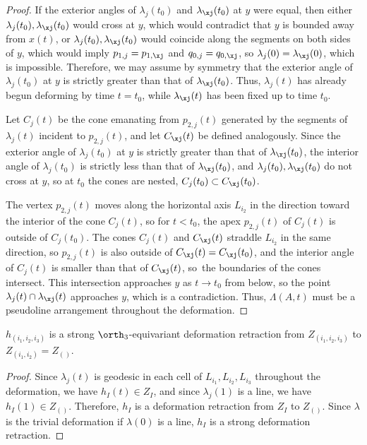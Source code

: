 \begin{proof}
If the exterior angles of $\lambda_j(t_0)$ and $\lambda_\xj(t_0)$ at $y$ were equal, then either $\lambda_j(t_0),\lambda_\xj(t_0)$ would cross at $y$, which would contradict that $y$ is bounded away from $x(t)$, or $\lambda_j(t_0),\lambda_\xj(t_0)$ would coincide along the segments on both sides of $y$, which would imply $p_{1,j} = p_{1,\xj}$ and $q_{0,j} = q_{0,\xj}$, so $\lambda_j(0) = \lambda_\xj(0)$, which is impossible.
Therefore, we may assume by symmetry that the exterior angle of $\lambda_j(t_0)$ at $y$ is strictly greater than that of $\lambda_\xj(t_0)$. Thus, $\lambda_j(t)$ has already begun deforming by time $t=t_0$, while $\lambda_\xj(t)$ has been fixed up to time $t_0$.

Let $C_j(t)$ be the cone emanating from $p_{2,j}(t)$ generated by the segments of $\lambda_j(t)$ incident to $p_{2,j}(t)$, and let $C_\xj(t)$ be defined analogously.
Since the exterior angle of $\lambda_j(t_0)$ at $y$ is strictly greater than that of $\lambda_\xj(t_0)$, the interior angle of $\lambda_j(t_0)$ is strictly less than that of $\lambda_\xj(t_0)$, and $\lambda_j(t_0),\lambda_\xj(t_0)$ do not cross at $y$, so at $t_0$ the cones are nested, \ie $C_j(t_0) \subset C_\xj(t_0)$.

The vertex $p_{2,j}(t)$ moves along the horizontal axis $L_{i_2}$ in the direction toward the interior of the cone $C_j(t)$, so for $t < t_0$, the apex $p_{2,j}(t)$ of $C_j(t)$ is outside of $C_j(t_0)$. The cones $C_j(t)$ and $C_\xj(t)$ straddle $L_{i_2}$ in the same direction, so $p_{2,j}(t)$ is also outside of $C_\xj(t)= C_\xj(t_0)$, and the interior angle of $C_j(t)$ is smaller than that of $C_\xj(t)$, so~the boundaries of the cones intersect.
This intersection approaches $y$ as $t\to t_0$ from below, so the point $\lambda_j(t)\cap \lambda_\xj(t)$ approaches $y$, which is a contradiction.
Thus, $\Lambda(A,t)$ must be a pseudoline arrangement throughout the deformation.
\end{proof}

\begin{claim}\label{claim-deform-h3}
$h_{(i_1,i_2,i_3)}$ is a strong $\orth_3$-equivariant deformation retraction from $Z_{(i_1,i_2,i_3)}$ to $Z_{(i_1,i_2)} = Z_{()}$.
\end{claim}

\begin{proof}
Since $\lambda_j(t)$ is geodesic in each cell of $L_{i_1},L_{i_2},L_{i_3}$ throughout the deformation, we have $h_I(t) \in Z_I$, and since $\lambda_j(1)$ is a line, we have $h_I(1) \in Z_{()}$.
Therefore, $h_I$ is a deformation retraction from $Z_I$ to $Z_{()}$.
Since $\lambda$ is the trivial deformation if $\lambda(0)$ is a line, $h_I$ is a strong deformation retraction.
\end{proof}


